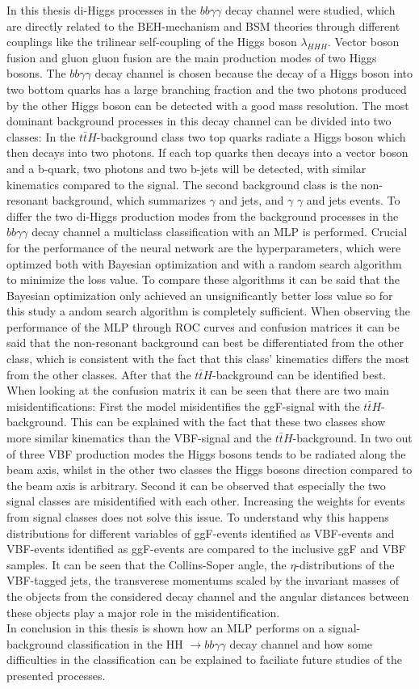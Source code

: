\label{sec:conclusion}

In this thesis di-Higgs processes in the $bb \gamma \gamma$ decay channel were studied, which are directly related to the BEH-mechanism and BSM theories through different couplings like the trilinear self-coupling of the Higgs boson $\lambda_{HHH}$.
Vector boson fusion and gluon gluon fusion are the main production modes of two Higgs bosons.
The $bb \gamma \gamma$ decay channel is chosen because the decay of a Higgs boson into two bottom quarks has a large branching fraction and the two photons produced by the other Higgs boson 
can be detected with a good mass resolution. The most dominant background processes in this decay channel can be divided into two classes: In the $t \bar{t} H$-background class two top quarks radiate
a Higgs boson which then decays into two photons. If each top quarks then decays into a vector boson and a b-quark, two photons and two b-jets will be detected, with similar kinematics compared to the signal.
The second background class is the non-resonant background, which summarizes $\gamma$ and jets, and $\gamma$ $\gamma$ and jets events. To differ the two di-Higgs production modes
from the background processes in the $bb \gamma \gamma$ decay channel a multiclass classification with an MLP is performed. Crucial for the performance of the neural network are the hyperparameters,
which were optimzed both with Bayesian optimization and with a random search algorithm to minimize the loss value. To compare these algorithms it can be said that the Bayesian optimization
only achieved an unsignificantly better loss value so for this study a andom search algorithm is completely sufficient. When observing the performance of the MLP through 
ROC curves and confusion matrices it can be said that the non-resonant background can best be differentiated from the other class, which is consistent with the fact that this class' kinematics
differs the most from the other classes. After that the $t \bar{t} H$-background can be identified best. When looking at the confusion matrix it can be seen that there are two main misidentifications:
First the model misidentifies the ggF-signal with the $t \bar{t} H$-background. This can be explained with the fact that these two classes show more similar kinematics than the VBF-signal and the $t \bar{t} H$-background.
In two out of three VBF production modes the Higgs bosons tends to be radiated along the beam axis, whilst in the other two classes the Higgs bosons direction compared to the beam axis is arbitrary. Second it can be observed that especially the two signal classes
are misidentified with each other. Increasing the weights for events from signal classes does not solve this issue. To understand why this happens distributions for different variables of ggF-events identified as VBF-events
and VBF-events identified as ggF-events are compared to the inclusive ggF and VBF samples. It can be seen that the Collins-Soper angle, the $\eta$-distributions of the VBF-tagged jets,
the transverese momentums scaled by the invariant masses of the objects from the considered decay channel and the angular distances between these objects play a major role in the misidentification. \\

In conclusion in this thesis is shown how an MLP performs on a signal-background classification in the HH $\rightarrow bb \gamma \gamma$ decay channel and how some difficulties in the classification can be explained
to faciliate future studies of the presented processes.